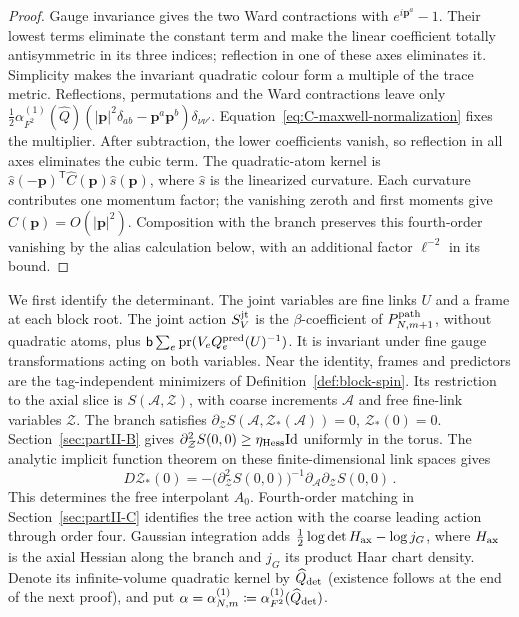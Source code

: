 \begin{proof}
Gauge invariance gives the two Ward contractions with $e^{i\mathbf p^a}-1$. Their lowest terms eliminate the constant term and make the linear coefficient totally antisymmetric in its three indices; reflection in one of these axes eliminates it. Simplicity makes the invariant quadratic colour form a multiple of the trace metric. Reflections, permutations and the Ward contractions leave only $\tfrac12\alpha^{(1)}_{F^2}(\widehat Q)(|\mathbf p|^2\delta_{ab}-\mathbf p^a\mathbf p^b)\delta_{\nu\nu'}$. Equation~\eqref{eq:C-maxwell-normalization} fixes the multiplier. After subtraction, the lower coefficients vanish, so reflection in all axes eliminates the cubic term. The quadratic-atom kernel is $\widehat s(-\mathbf p)^{\mathsf T}\widehat C(\mathbf p)\widehat s(\mathbf p)$, where $\widehat s$ is the linearized curvature. Each curvature contributes one momentum factor; the vanishing zeroth and first moments give $\widehat C(\mathbf p)=O(|\mathbf p|^2)$. Composition with the branch preserves this fourth-order vanishing by the alias calculation below, with an additional factor $\ell^{-2}$ in its bound.
\end{proof}

We first identify the determinant. The joint variables are fine links $U$ and a frame at each block root. The joint action $S^{\rm jt}_V$ is the $\beta$-coefficient of $P^{\mathrm{path}}_{N,m+1}$, without quadratic atoms, plus
$\mathsf{b}\sum_e\operatorname{pr}(V_eQ_e^{\rm pred}(U)^{-1})$.
It is invariant under fine gauge transformations acting on both variables. Near the identity, frames and predictors are the tag-independent minimizers of Definition~\ref{def:block-spin}. Its restriction to the axial slice is $S(\mathcal A,\mathcal Z)$, with coarse increments $\mathcal A$ and free fine-link variables $\mathcal Z$. The branch satisfies $\partial_{\mathcal Z}S(\mathcal A,\mathcal Z_*(\mathcal A))=0$, $\mathcal Z_*(0)=0$. Section~\ref{sec:partII-B} gives $\partial_{\mathcal Z}^2S(0,0)\ge\eta_{\rm Hess}\mathrm{Id}$ uniformly in the torus. The analytic implicit function theorem on these finite-dimensional link spaces gives
\begin{equation}\label{eq:C-stationary-derivative}
 D\mathcal Z_*(0)=-\bigl(\partial_{\mathcal Z}^2S(0,0)\bigr)^{-1}\partial_{\mathcal A}\partial_{\mathcal Z}S(0,0)\,.
\end{equation}
This determines the free interpolant $A_0$. Fourth-order matching in Section~\ref{sec:partII-C} identifies the tree action with the coarse leading action through order four. Gaussian integration adds $\tfrac12\log\det H_{\rm ax}-\log j_G$, where $H_{\rm ax}$ is the axial Hessian along the branch and $j_G$ its product Haar chart density. Denote its infinite-volume quadratic kernel by $\widehat Q_{\rm det}$ (existence follows at the end of the next proof), and put $\alpha=\alpha^{(1)}_{N,m}\coloneqq\alpha^{(1)}_{F^2}(\widehat Q_{\rm det})$.

